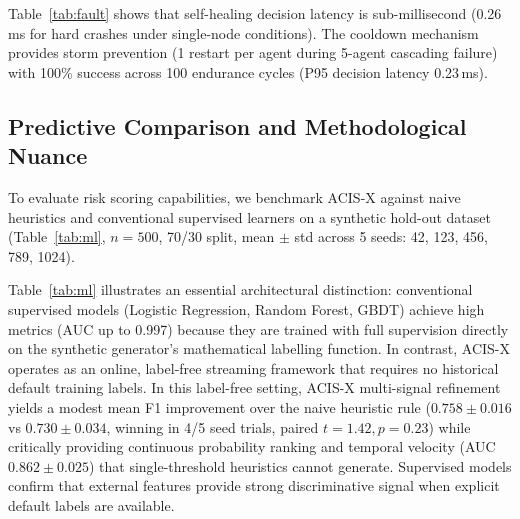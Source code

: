\documentclass[conference]{IEEEtran}
\begin{document}
Table~\ref{tab:fault} shows that self-healing decision latency is sub-millisecond (0.26\,ms for hard crashes under single-node conditions). The cooldown mechanism provides storm prevention (1 restart per agent during 5-agent cascading failure) with 100\% success across 100 endurance cycles (P95 decision latency 0.23\,ms).

\subsection{Predictive Comparison and Methodological Nuance}

To evaluate risk scoring capabilities, we benchmark ACIS-X against naive heuristics and conventional supervised learners on a synthetic hold-out dataset (Table~\ref{tab:ml}, $n=500$, 70/30 split, mean $\pm$ std across 5 seeds: 42, 123, 456, 789, 1024). 

\begin{table}[htbp]
\caption{Predictive benchmark on synthetic hold-out ($n=500$, 5 seeds, mean $\pm$ std). Supervised models are trained directly on generator ground-truth labels; ACIS-X operates label-free.}
\label{tab:ml}
\centering\scriptsize
{}
\end{table}

Table~\ref{tab:ml} illustrates an essential architectural distinction: conventional supervised models (Logistic Regression, Random Forest, GBDT) achieve high metrics (AUC up to 0.997) because they are trained with full supervision directly on the synthetic generator's mathematical labelling function. In contrast, ACIS-X operates as an online, label-free streaming framework that requires no historical default training labels. In this label-free setting, ACIS-X multi-signal refinement yields a modest mean F1 improvement over the naive heuristic rule ($0.758\pm0.016$ vs $0.730\pm0.034$, winning in 4/5 seed trials, paired $t=1.42, p=0.23$) while critically providing continuous probability ranking and temporal velocity (AUC $0.862\pm0.025$) that single-threshold heuristics cannot generate. Supervised models confirm that external features provide strong discriminative signal when explicit default labels are available.
\end{document}
